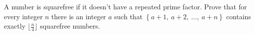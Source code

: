 \begin{problem}
    \noindent A number is squarefree if it doesn't have a repeated prime factor. Prove that for every integer \( n \) there is an integer \( a \) such that \( \left\{a+1,\ a+2,\ \ldots,\ a+n\right\} \) contains exactly \( \lfloor\frac{n}{4}\rfloor \) squarefree numbers.
\end{problem}

